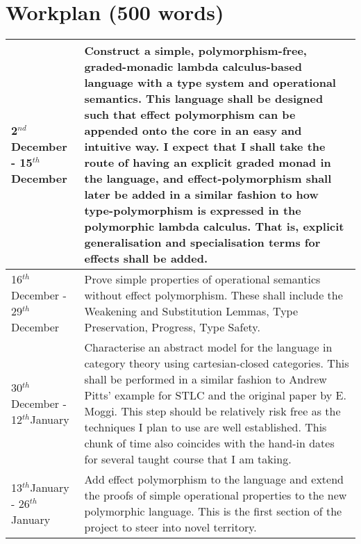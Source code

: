 \documentclass[11pt]{article}
\renewcommand{\th}{$^{th}$}
\newcommand{\nd}{$^{nd}$}
\begin{document}
\section{Workplan (500 words)}

\begin{tabular}{|p{6cm}||p{10cm}|}
\hline
	2\nd December - 15\th December & Construct a simple, polymorphism-free, graded-monadic lambda calculus-based language with a type system and operational semantics. This language shall be designed such that effect polymorphism can be appended onto the core in an easy and intuitive way. I expect that I shall take the route of having an explicit graded monad in the language, and effect-polymorphism shall later be added in a similar fashion to how type-polymorphism is expressed in the polymorphic lambda calculus. That is, explicit generalisation and specialisation terms for effects shall be added. \\\hline
	16\th December - 29\th December & Prove simple properties of operational semantics without effect polymorphism. These shall include the Weakening and Substitution Lemmas, Type Preservation, Progress, Type Safety.\\\hline
	30\th December - 12\th January & Characterise an abstract model for the language in category theory using cartesian-closed categories. This shall be performed in a similar fashion to Andrew Pitts' example for STLC and the original paper by E. Moggi. This step should be relatively risk free as the techniques I plan to use are well established. This chunk of time also coincides with the hand-in dates for several taught course that I am taking.  \\\hline
	13\th January - 26\th January &  Add effect polymorphism to the language and extend the proofs of simple operational properties to the new polymorphic language. This is the first section of the project to steer into novel territory. \\\hline
	

\end{tabular}
\end{document}
